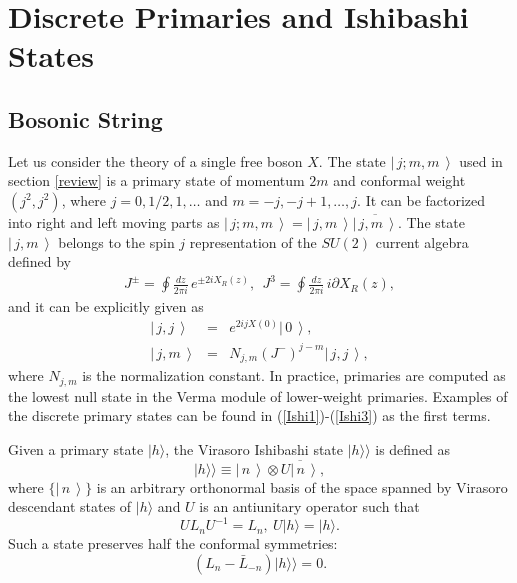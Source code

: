 \documentclass[a4paper,12pt]{article} \textheight=8.5truein
\newcommand{\ket}[1]{\left|\, #1\,\right\rangle}
\newcommand{\ol}{\overline}
\begin{document}
\appendix
\setcounter{equation}{0}
\renewcommand{\theequation}{\Alph{section}.\arabic{equation}}
\section{Discrete Primaries and Ishibashi States}\label{discrete}
\subsection{Bosonic String}
Let us consider the theory of a single free boson $X$. The state
$\ket{j;m,m}$ used in section \ref{review} is a primary state of
momentum $2m$ and conformal weight $(j^2,j^2)$, where
$j=0,1/2,1,\dots$ and $m=-j,-j+1,\dots,j$. It can be factorized
into right and left moving parts as
$\ket{j;m,m}=\ket{j,m}\ol{\ket{j,m}}$. The state $\ket{j,m}$
belongs to the spin $j$ representation of the $SU(2)$ current
algebra defined by
\begin{eqnarray}
J^\pm=\oint\frac{dz}{2\pi i}\,e^{\pm 2iX_R(z)},~~
J^3=\oint\frac{dz}{2\pi i}\,i\partial X_R(z),
\end{eqnarray}
and it can be explicitly given as \cite{Klebanov:1991hx}
\begin{eqnarray}
\ket{j,j}&=& e^{2ijX(0)}\ket{0},\\
\ket{j,m}&=&N_{j,m}(J^-)^{j-m}\ket{j,j},
\end{eqnarray}
where $N_{j,m}$ is the normalization constant.
In practice, primaries are computed as the lowest null state in
the Verma module of lower-weight primaries. Examples of the
discrete primary states can be found in
(\ref{Ishi1})-(\ref{Ishi3}) as the first terms.


Given a primary state $|h\rangle$, the Virasoro Ishibashi state
$|h\rangle\rangle$ is defined as \cite{Ishibashi:1988kg}
\begin{equation}\label{ishibashi}
|h\rangle\rangle\equiv\ket{n}\otimes \ol{U\ket{n}},
\end{equation}
where $\{\ket{n}\}$ is an arbitrary orthonormal basis of the space
spanned by Virasoro descendant states of $|h\rangle$ and $U$ is an
antiunitary operator such that
\begin{equation}\label{U 1}
U L_n U^{-1}=L_n,\ U |h\rangle=|h\rangle.
\end{equation}
Such a state preserves half the conformal symmetries:
\begin{equation}    (L_n-\bar{L}_{-n})|h\rangle\rangle=0.
\end{equation}
\end{document}
